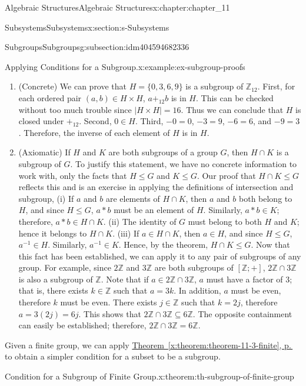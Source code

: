 \documentclass[twoside,10pt,]{book}
\newcommand{\xreffont}{\relax}
\numberwithin{equation}{section}
\begin{document}
\begin{chapterptx}{Algebraic Structures}{}{Algebraic Structures}{}{}{x:chapter:chapter_11}
\begin{sectionptx}{Subsystems}{}{Subsystems}{}{}{x:section:s-Subsystems}
\begin{subsectionptx}{Subgroups}{}{Subgroups}{}{}{g:subsection:idm404594682336}
\begin{example}{Applying Conditions for a Subgroup.}{x:example:ex-subgroup-proofs}
\begin{enumerate}[label=(\alph*)]
\item{}(Concrete) We can prove that \(H = \{0, 3, 6, 9\}\) is a subgroup of \(\mathbb{Z}_{12}\). First, for each ordered pair \((a, b) \in  H \times
H\), \(a +_{12} b\) is in \(H\). This can be checked without too much trouble since \(\left| H \times H\right| = 16\). Thus we can conclude that \(H\) is closed under \(+_{12}\). Second, \(0\in H\). Third, \(-0 = 0\), \(-3 = 9\), \(-6 = 6\), and \(-9 = 3\). Therefore, the inverse of each element of \(H\) is in \(H\).%
\item{}(Axiomatic) If \(H\) and \(K\) are both subgroups of a group \(G\), then \(H \cap  K\) is a subgroup of \(G\). To justify this statement, we have no concrete information to work with, only the facts that \(H \leq  G\) and \(K \leq G\). Our proof that \(H \cap  K \leq  G\) reflects this and is an exercise in applying the definitions of intersection and subgroup, (i) If \(a\) and \(b\) are elements of \(H \cap K\), then \(a\) and \(b\) both belong to \(H\), and since \(H \leq  G\), \(a * b\) must be an element of \(H\). Similarly, \(a * b \in  K\); therefore, \(a * b \in  H \cap  K\). (ii) The identity of \(G\) must belong to both \(H\) and \(K\); hence it belongs to \(H \cap  K\). (iii) If \(a \in H \cap K\), then \(a \in 
H\), and since \(H \leq  G\), \(a^{-1}\in  H\).  Similarly, \(a^{-1}\in K\). Hence, by the theorem,  \(H \cap  K \leq  G\). Now that this fact has been established, we can apply it to any pair of subgroups of any group. For example, since \(2\mathbb{Z}\) and \(3\mathbb{Z}\) are both subgroups of \([\mathbb{Z};+]\), \(2\mathbb{Z} \cap  3\mathbb{Z}\) is also a subgroup of \(\mathbb{Z}\). Note that if \(a \in 2\mathbb{Z}
\cap  3\mathbb{Z}\),  \(a\) must have a factor of 3; that is, there exists \(k\in \mathbb{Z}\) such that \(a = 3k\). In addition, \(a\) must be even, therefore \(k\) must be even. There exists \(j \in  \mathbb{Z}\) such that \(k = 2j\), therefore \(a = 3(2j)= 6j\).  This shows that \(2\mathbb{Z}\cap  3\mathbb{Z}\subseteq  6\mathbb{Z}\). The opposite containment can easily be established; therefore, \(2\mathbb{Z} \cap  3\mathbb{Z}
= 6\mathbb{Z}\).%
\end{enumerate}
%
\end{example}
Given a finite group, we can apply \hyperref[x:theorem:theorem-11-3-finite]{Theorem~{\xreffont\ref{x:theorem:theorem-11-3-finite}}, p.\,\pageref{x:theorem:theorem-11-3-finite}} to obtain a simpler condition for a subset to be a subgroup.%
\begin{theorem}{Condition for a Subgroup of Finite Group.}{}{x:theorem:th-subgroup-of-finite-group}%

\end{theorem}
\end{subsectionptx}
\end{sectionptx}
\end{chapterptx}
\end{document}
